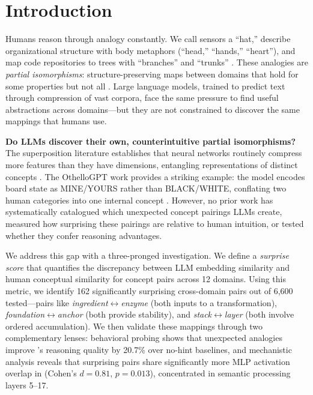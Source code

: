 \section{Introduction}
\label{sec:intro}

Humans reason through analogy constantly.
We call sensors a ``hat,'' describe organizational structure with body metaphors (``head,'' ``hands,'' ``heart''), and map code repositories to trees with ``branches'' and ``trunks'' \citep{lakoff1980metaphors, hofstadter2001analogy}.
These analogies are \emph{partial isomorphisms}: structure-preserving maps between domains that hold for some properties but not all \citep{gentner1983structure}.
Large language models, trained to predict text through compression of vast corpora, face the same pressure to find useful abstractions across domains---but they are not constrained to discover the same mappings that humans use.

{\bf Do LLMs discover their own, counterintuitive partial isomorphisms?}
The superposition literature establishes that neural networks routinely compress more features than they have dimensions, entangling representations of distinct concepts \citep{elhage2022superposition, scherlis2022polysemanticity}.
The OthelloGPT work provides a striking example: the model encodes board state as MINE/YOURS rather than BLACK/WHITE, conflating two human categories into one internal concept \citep{nanda2023emergent}.
However, no prior work has systematically catalogued which unexpected concept pairings LLMs create, measured how surprising these pairings are relative to human intuition, or tested whether they confer reasoning advantages.

We address this gap with a three-pronged investigation.
We define a \emph{surprise score} that quantifies the discrepancy between LLM embedding similarity and human conceptual similarity for concept pairs across 12 domains.
Using this metric, we identify 162 significantly surprising cross-domain pairs out of 6,600 tested---pairs like \emph{ingredient}$\leftrightarrow$\emph{enzyme} (both inputs to a transformation), \emph{foundation}$\leftrightarrow$\emph{anchor} (both provide stability), and \emph{stack}$\leftrightarrow$\emph{layer} (both involve ordered accumulation).
We then validate these mappings through two complementary lenses: behavioral probing shows that unexpected analogies improve \gptfour's reasoning quality by 20.7\% over no-hint baselines, and mechanistic analysis reveals that surprising pairs share significantly more MLP activation overlap in \pythia (Cohen's $d = 0.81$, $p = 0.013$), concentrated in semantic processing layers 5--17.

